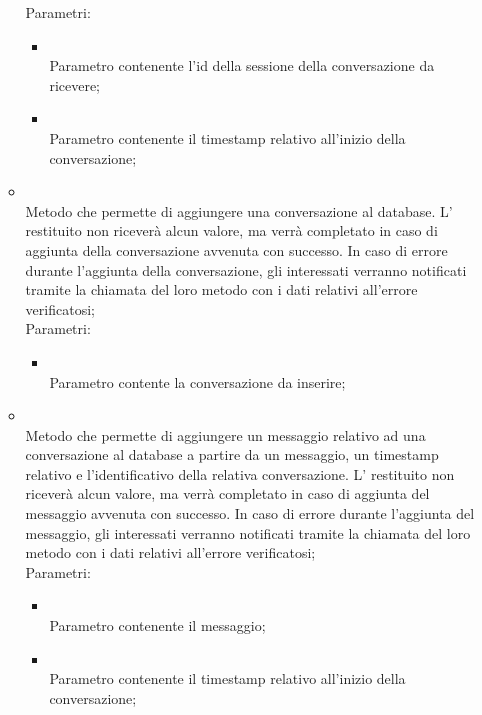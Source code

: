 \begin{itemize}
\begin{itemize}
		Parametri:
		\begin{itemize}
			\item {} \\
			Parametro contenente l'id della sessione della conversazione da ricevere;
			\item {} \\
			Parametro contenente il timestamp relativo all'inizio della conversazione;
		\end{itemize}
		\item[]  \\
		Metodo che permette di aggiungere una conversazione al database.  L' restituito non riceverà alcun valore, ma verrà completato in caso di aggiunta della conversazione avvenuta con successo. In caso di errore durante l'aggiunta della conversazione, gli  interessati verranno notificati tramite la chiamata del loro metodo  con i dati relativi all'errore verificatosi;\\
		Parametri:
		\begin{itemize}
			\item {} \\
			Parametro contente la conversazione da inserire;
		\end{itemize}
		\item[]  \\
		Metodo che permette di aggiungere un messaggio relativo ad una conversazione al database a partire da un messaggio, un timestamp relativo e l'identificativo della relativa conversazione.  L' restituito non riceverà alcun valore, ma verrà completato in caso di aggiunta del messaggio avvenuta con successo. In caso di errore durante l'aggiunta del messaggio, gli  interessati verranno notificati tramite la chiamata del loro metodo  con i dati relativi all'errore verificatosi;\\
		Parametri:
		\begin{itemize}
			\item {} \\
			Parametro contenente il messaggio;
			\item {} \\
			Parametro contenente il timestamp relativo all'inizio della conversazione;

\end{itemize}
\end{itemize}
\end{itemize}
